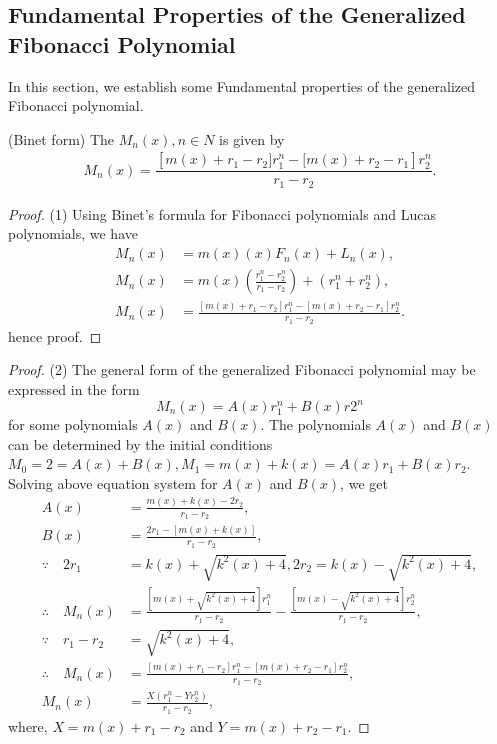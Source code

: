 \subsection{Fundamental Properties of the Generalized Fibonacci Polynomial}
In this section, we establish some Fundamental properties of  the generalized Fibonacci polynomial.
\begin{theorem} (Binet form)
The $M_{n}(x),n\in{N}$  is given by
\begin{align*}
M_{n}(x)=\dfrac{\left[ m(x)+r_{1}-r_{2}]r_{1}^{n}-[m(x)+r_{2}-r_{1}\right] r_{2}^{n}}{r_{1}-r_{2}}.
\end{align*}
\end{theorem}
\begin{proof}(1)
Using Binet's formula for Fibonacci polynomials and Lucas polynomials, we have
\begin{align*}
M_{n}(x) &= m(x)(x)F_{n}(x)+L_{n}(x),\\
M_{n}(x) &= m(x)(\frac{{r}_{1}^n-{r}_{2}^n}{r_{1}-r_{2}})+({r}_{1}^n+{r}_{2}^n),\\
M_{n}(x)&=\frac{[m(x)+r_{1}-r_{2}]r_{1}^{n}-[m(x)+r_{2}-r_{1}]r_{2}^{n}}{r_{1}-r_{2}}.
\end{align*}
hence proof.
\end{proof}
\begin{proof}(2)
The general form of the generalized Fibonacci polynomial may be expressed in the form
$$M_{n}(x)=A(x) r_{1}^n+B(x) r{2}^n$$ for some polynomials $A(x)$ and $B(x)$.
The polynomials $A(x)$ and $B(x)$ can be determined by the initial conditions $M_{0}=2=A(x)+B(x),M_{1}=m(x)+k(x)=A(x)r_{1}+B(x)r_{2}$.
Solving above equation system for $A(x)$ and $B(x)$, we get
\begin{align*}
A(x) & = \frac{{m(x)+k(x)}-2r_{2}}{r_{1}-r_{2}},\\
B(x) & = \frac{2r_{1}-[m(x)+k(x)]}{r_{1}-r_{2}},\\
\because\quad
2r_{1}& = k(x)+\sqrt{k^{2}(x)+4},2r_{2}=k(x)-\sqrt{k^{2}(x)+4},\\
\therefore \quad
M_{n}(x)& = \frac{[m(x)+\sqrt{k^{2}(x)+4}] {r}_{1}^n}{r_{1}-r_{2}} - \frac{[m(x)-\sqrt{k^{2}(x)+4}] {r}_{2}^n}{r_{1}-r_{2}},\\
\because \quad r_{1}-r_{2}& = \sqrt{k^{2}(x)+4},\\
\therefore\quad M_{n}(x)& = \frac{[m(x)+r_{1}-r_{2}]{r}_{1}^n-[m(x)+r_{2}-r_{1}]r_{2}^n}{r_{1}-r_{2}},\\
M_{n}(x)& = \frac{X({r}_{1}^n-Y{r}_{2}^n)}{r_{1}-r_{2}},
\end{align*}
where, $X={m(x)+r_{1}-r_{2}}$  and  $Y={m(x)+r_{2}-r_{1}}$.
\end{proof}
